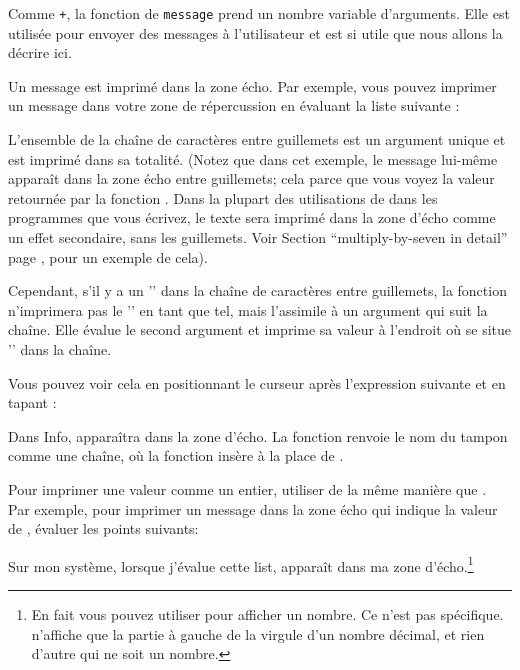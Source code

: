 Comme \texttt{+}, la fonction de \texttt{message} prend un nombre
variable d'arguments. Elle est utilisée pour envoyer des messages à
l'utilisateur et est si utile que nous allons la décrire ici.

Un message est imprimé dans la zone écho. Par exemple, vous pouvez
imprimer un message dans votre zone de répercussion en évaluant la
liste suivante :   


L'ensemble de la chaîne de caractères entre guillemets est un argument
unique et est imprimé dans sa totalité. (Notez que dans cet exemple,
le message lui-même apparaît dans la zone écho entre guillemets; cela
parce que vous voyez la valeur retournée par la fonction
. Dans la plupart des utilisations de  dans
les programmes que vous écrivez, le texte sera imprimé dans la zone
d'écho comme un effet secondaire, sans les guillemets. Voir Section
 ``multiply-by-seven in detail'' page
, pour un exemple de cela).

Cependant, s'il y a un '' dans la chaîne de caractères entre
guillemets, la fonction  n'imprimera pas le '' en
tant que tel, mais l'assimile à un argument qui suit la chaîne. Elle
évalue le second argument et imprime sa valeur à l'endroit où se situe
'' dans la chaîne.

Vous pouvez voir cela en positionnant le curseur après l'expression
suivante et en tapant :


Dans Info,  apparaîtra
dans la zone d'écho. La fonction  renvoie  le nom du
tampon comme une chaîne, où la fonction  insère à la place
de .

Pour imprimer une valeur comme un entier, utiliser  de la
même manière que .  Par exemple, pour imprimer un message
dans la zone écho qui indique la valeur de , évaluer les
points suivants:


Sur mon système, lorsque j'évalue cette list,  apparaît dans ma zone d'écho.\footnote{En fait
    vous pouvez utiliser  pour afficher un nombre. Ce n'est
    pas spécifique.  n'affiche que la partie à gauche de la
    virgule d'un nombre décimal, et rien d'autre qui ne soit un
    nombre.}

